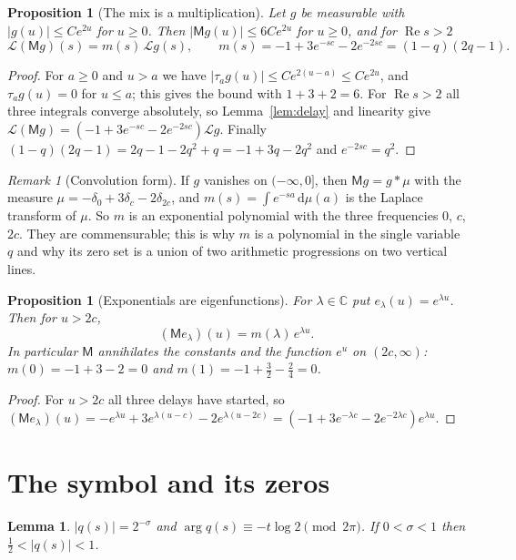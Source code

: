 \documentclass[11pt]{amsart}
\newtheorem{proposition}[theorem]{Proposition}
\newtheorem{lemma}[theorem]{Lemma}
\theoremstyle{definition}
\theoremstyle{remark}
\newtheorem{remark}[theorem]{Remark}
\DeclareMathOperator{\re}{Re}
\newcommand{\C}{\mathbb{C}}
\newcommand{\cL}{\mathcal{L}}
\newcommand{\M}{\mathsf{M}}
\newcommand{\dd}{\,\mathrm{d}}
\begin{document}
\begin{proposition}[The mix is a multiplication]\label{prop:symbol}
Let $g$ be measurable with $|g(u)|\le Ce^{2u}$ for $u\ge0$. Then $|\M g(u)|\le 6Ce^{2u}$ for
$u\ge 0$, and for $\re s>2$
\[
\cL(\M g)(s)=m(s)\,\cL g(s),\qquad m(s)=-1+3e^{-sc}-2e^{-2sc}=(1-q)(2q-1).
\]
\end{proposition}

\begin{proof}
For $a\ge0$ and $u>a$ we have $|\tau_ag(u)|\le Ce^{2(u-a)}\le Ce^{2u}$, and $\tau_ag(u)=0$ for
$u\le a$; this gives the bound with $1+3+2=6$. For $\re s>2$ all three integrals converge
absolutely, so Lemma~\ref{lem:delay} and linearity give
$\cL(\M g)=(-1+3e^{-sc}-2e^{-2sc})\cL g$. Finally $(1-q)(2q-1)=2q-1-2q^2+q=-1+3q-2q^2$ and
$e^{-2sc}=q^2$.
\end{proof}

\begin{remark}[Convolution form]\label{rem:convolution}
If $g$ vanishes on $(-\infty,0]$, then $\M g=g*\mu$ with the measure
$\mu=-\delta_0+3\delta_{c}-2\delta_{2c}$, and $m(s)=\int e^{-sa}\dd\mu(a)$ is the Laplace transform
of $\mu$. So $m$ is an exponential polynomial with the three frequencies $0$, $c$, $2c$. They are
commensurable; this is why $m$ is a polynomial in the single variable $q$ and why its zero set
is a union of two arithmetic progressions on two vertical lines.
\end{remark}

\begin{proposition}[Exponentials are eigenfunctions]\label{prop:modes}
For $\lambda\in\C$ put $e_\lambda(u)=e^{\lambda u}$. Then for $u>2c$,
\[
(\M e_\lambda)(u)=m(\lambda)\,e^{\lambda u}.
\]
In particular $\M$ annihilates the constants and the function $e^{u}$ on $(2c,\infty)$:
$m(0)=-1+3-2=0$ and $m(1)=-1+\tfrac32-\tfrac24=0$.
\end{proposition}

\begin{proof}
For $u>2c$ all three delays have started, so
$(\M e_\lambda)(u)=-e^{\lambda u}+3e^{\lambda(u-c)}-2e^{\lambda(u-2c)}
=(-1+3e^{-\lambda c}-2e^{-2\lambda c})e^{\lambda u}$.
\end{proof}

\section{The symbol and its zeros}\label{sec:symbol}

\begin{lemma}\label{lem:radius}
$|q(s)|=2^{-\sigma}$ and $\arg q(s)\equiv -t\log 2 \pmod{2\pi}$. If $0<\sigma<1$ then
$\tfrac12<|q(s)|<1$.
\end{lemma}
\end{document}
